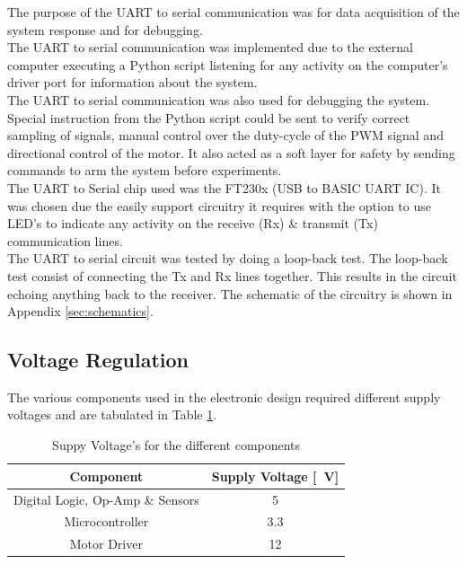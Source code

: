 The purpose of the UART to serial communication was for data acquisition of the system response and for debugging.\\

The UART to serial communication was implemented due to the external computer executing a Python script listening for any activity on the computer's driver port for information about the system.\\

The UART to serial communication was also used for debugging the system. Special instruction from the Python script could be sent to verify correct sampling of signals, manual control over the duty-cycle of the PWM signal and directional control of the motor. It also acted as a soft layer for safety by sending commands to arm the system before experiments. \\

The UART to Serial chip used was the FT230x (USB to BASIC UART IC). It was chosen due the easily support circuitry it requires with the option to use LED's to indicate any activity on the receive (Rx)  \& transmit (Tx) communication lines.\\

 
The UART to serial circuit was tested by doing a loop-back test. The loop-back test consist of connecting the Tx and Rx lines together. This results in the circuit echoing anything back to the receiver. The schematic of the circuitry is shown in Appendix \ref{sec:schematics}.


\subsection{Voltage Regulation}

The various components used in the electronic design required different supply voltages and are tabulated in Table \ref{table:supplyVoltage}.\\


\begin{table}[]
	\centering
	\begin{tabular}{|c|c|}
		\hline
		Component & Supply Voltage [\SI{}{V}] \\
		\hline
		\hline
		Digital Logic, Op-Amp \& Sensors & \SI{5}{} \\
		\hline
		Microcontroller & \SI{3.3}{} \\
		\hline
		Motor Driver & \SI{12}{} \\
		\hline
	\end{tabular}
	\caption{Suppy Voltage's for the different components}
	\label{table:supplyVoltage}
\end{table}

